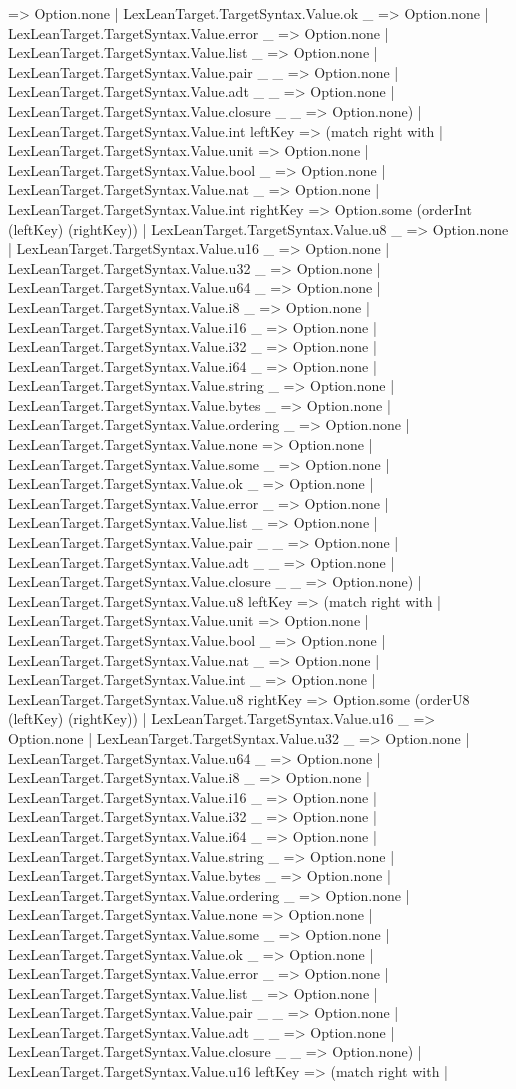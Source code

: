 \documentclass[11pt]{article}
\begin{document}
=> Option.none | LexLeanTarget.TargetSyntax.Value.ok \_ => Option.none | LexLeanTarget.TargetSyntax.Value.error \_ => Option.none | LexLeanTarget.TargetSyntax.Value.list \_ => Option.none | LexLeanTarget.TargetSyntax.Value.pair \_ \_ => Option.none | LexLeanTarget.TargetSyntax.Value.adt \_ \_ => Option.none | LexLeanTarget.TargetSyntax.Value.closure \_ \_ => Option.none) | LexLeanTarget.TargetSyntax.Value.int leftKey => (match right with | LexLeanTarget.TargetSyntax.Value.unit => Option.none | LexLeanTarget.TargetSyntax.Value.bool \_ => Option.none | LexLeanTarget.TargetSyntax.Value.nat \_ => Option.none | LexLeanTarget.TargetSyntax.Value.int rightKey => Option.some (orderInt (leftKey) (rightKey)) | LexLeanTarget.TargetSyntax.Value.u8 \_ => Option.none | LexLeanTarget.TargetSyntax.Value.u16 \_ => Option.none | LexLeanTarget.TargetSyntax.Value.u32 \_ => Option.none | LexLeanTarget.TargetSyntax.Value.u64 \_ => Option.none | LexLeanTarget.TargetSyntax.Value.i8 \_ => Option.none | LexLeanTarget.TargetSyntax.Value.i16 \_ => Option.none | LexLeanTarget.TargetSyntax.Value.i32 \_ => Option.none | LexLeanTarget.TargetSyntax.Value.i64 \_ => Option.none | LexLeanTarget.TargetSyntax.Value.string \_ => Option.none | LexLeanTarget.TargetSyntax.Value.bytes \_ => Option.none | LexLeanTarget.TargetSyntax.Value.ordering \_ => Option.none | LexLeanTarget.TargetSyntax.Value.none => Option.none | LexLeanTarget.TargetSyntax.Value.some \_ => Option.none | LexLeanTarget.TargetSyntax.Value.ok \_ => Option.none | LexLeanTarget.TargetSyntax.Value.error \_ => Option.none | LexLeanTarget.TargetSyntax.Value.list \_ => Option.none | LexLeanTarget.TargetSyntax.Value.pair \_ \_ => Option.none | LexLeanTarget.TargetSyntax.Value.adt \_ \_ => Option.none | LexLeanTarget.TargetSyntax.Value.closure \_ \_ => Option.none) | LexLeanTarget.TargetSyntax.Value.u8 leftKey => (match right with | LexLeanTarget.TargetSyntax.Value.unit => Option.none | LexLeanTarget.TargetSyntax.Value.bool \_ => Option.none | LexLeanTarget.TargetSyntax.Value.nat \_ => Option.none | LexLeanTarget.TargetSyntax.Value.int \_ => Option.none | LexLeanTarget.TargetSyntax.Value.u8 rightKey => Option.some (orderU8 (leftKey) (rightKey)) | LexLeanTarget.TargetSyntax.Value.u16 \_ => Option.none | LexLeanTarget.TargetSyntax.Value.u32 \_ => Option.none | LexLeanTarget.TargetSyntax.Value.u64 \_ => Option.none | LexLeanTarget.TargetSyntax.Value.i8 \_ => Option.none | LexLeanTarget.TargetSyntax.Value.i16 \_ => Option.none | LexLeanTarget.TargetSyntax.Value.i32 \_ => Option.none | LexLeanTarget.TargetSyntax.Value.i64 \_ => Option.none | LexLeanTarget.TargetSyntax.Value.string \_ => Option.none | LexLeanTarget.TargetSyntax.Value.bytes \_ => Option.none | LexLeanTarget.TargetSyntax.Value.ordering \_ => Option.none | LexLeanTarget.TargetSyntax.Value.none => Option.none | LexLeanTarget.TargetSyntax.Value.some \_ => Option.none | LexLeanTarget.TargetSyntax.Value.ok \_ => Option.none | LexLeanTarget.TargetSyntax.Value.error \_ => Option.none | LexLeanTarget.TargetSyntax.Value.list \_ => Option.none | LexLeanTarget.TargetSyntax.Value.pair \_ \_ => Option.none | LexLeanTarget.TargetSyntax.Value.adt \_ \_ => Option.none | LexLeanTarget.TargetSyntax.Value.closure \_ \_ => Option.none) | LexLeanTarget.TargetSyntax.Value.u16 leftKey => (match right with | 
\end{document}
